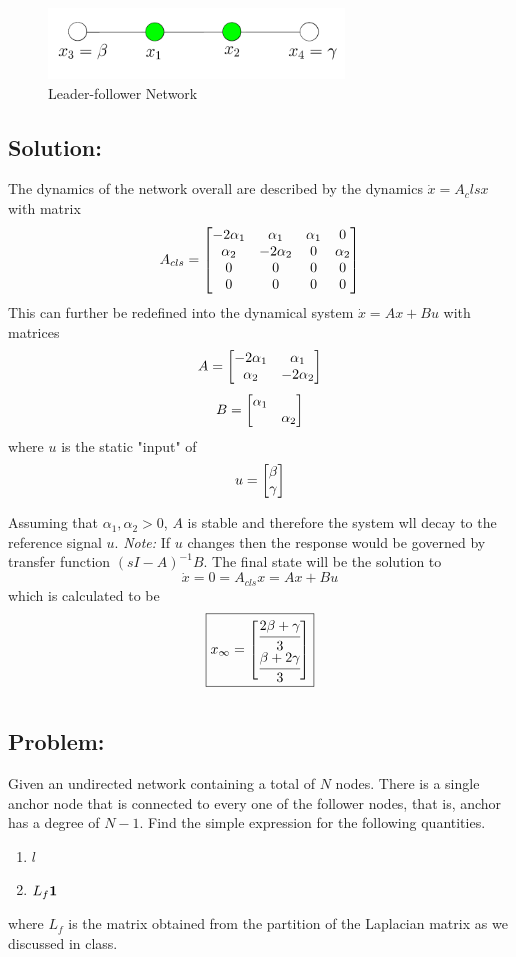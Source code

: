 \documentclass[]{article}
\numberwithin{equation}{section}
\begin{document}
\begin{figure}[h]
    \centering
    \includegraphics[width=0.7\textwidth]{figs/pblm3.png}
    \caption{Leader-follower Network}
    \label{fig:pblm3}
\end{figure}

\subsection*{Solution:}
The dynamics of the network overall are described by the dynamics $\dot{x} = A_cls x$ with matrix \[
    A_{cls} = \mqty[
        -2 \alpha_1 & \alpha_1 & \alpha_1 &0\\
        \alpha_2 & - 2 \alpha_2 & 0 & \alpha_2\\
        0  & 0 & 0 & 0\\
        0  & 0 & 0 & 0
    ]
\] This can further be redefined into the dynamical system $\dot{x} = A x + B u$ with matrices \[
    A = \mqty[
        -2 \alpha_1 & \alpha_1\\
        \alpha_2    & -2 \alpha_2
    ]
\] \[
    B = \mqty[\dmat{
        \alpha_1,
        \alpha_2
    }]
\] where $u$ is the static "input" of \[
    u = \mqty[
        \beta\\
        \gamma
    ]
\]

Assuming that $\alpha_1, \alpha_2 > 0$, $A$ is stable and therefore the system wll decay to the reference signal $u$.
\emph{Note:} If $u$ changes then the response would be governed by transfer function $(s I - A)^{-1} B$.
The final state will be the solution to \[
    \dot{x} = 0 = A_{cls} x = A x + B u
\] which is calculated to be \[\boxed{
    x_{\infty} = \mqty[
        \cfrac{2 \beta + \gamma}{3}\\
        \cfrac{\beta + 2 \gamma}{3}
    ]
}\]
    

\newpage
\section{}
\subsection*{Problem:}
Given an undirected network containing a total of $N$ nodes. 
There is a single anchor node that is connected to every one of the follower nodes, that is, anchor has a degree of $N-1$. 
Find the simple expression for the following quantities.
\begin{enumerate}
    \item $l$
    \item $L_f \vb{1}$
\end{enumerate}
where $L_f$ is the matrix obtained from the partition of the Laplacian matrix as we discussed in class.
\end{document}
